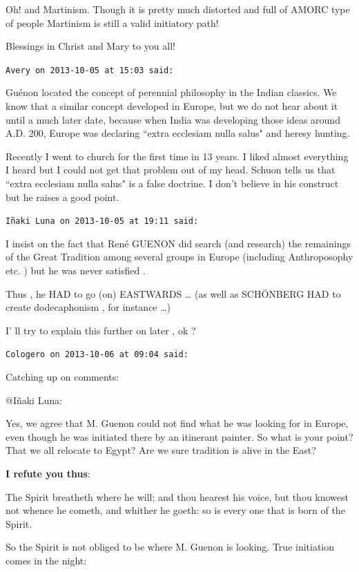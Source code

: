 \begin{footnotesize}
\begin{sffamily}
Oh! and Martinism. Though it is pretty much distorted and full of AMORC type of people Martinism is still a valid initiatory path!

Blessings in Christ and Mary to you all!


\hfill

\texttt{Avery on 2013-10-05 at 15:03 said: }

Guénon located the concept of perennial philosophy in the Indian classics. We know that a similar concept developed in Europe, but we do not hear about it until a much later date, because when India was developing those ideas around A.D. 200, Europe was declaring ``extra ecclesiam nulla salus" and heresy hunting.

Recently I went to church for the first time in 13 years. I liked almost everything I heard but I could not get that problem out of my head. Schuon tells us that ``extra ecclesiam nulla salus" is a false doctrine. I don't believe in his construct but he raises a good point.


\hfill

\texttt{Iñaki Luna on 2013-10-05 at 19:11 said: }

I insist on the fact that René GUENON did search (and research) the remainings of the Great Tradition among several groups in Europe (including Anthroposophy etc. ) but he was never satisfied .

Thus , he HAD to go (on) EASTWARDS … (as well as SCHÖNBERG HAD to create dodecaphonism , for instance …) 

I' ll try to explain this further on later , ok ?


\hfill

\texttt{Cologero on 2013-10-06 at 09:04 said: }

Catching up on comments:

@Iñaki Luna:

Yes, we agree that M. Guenon could not find what he was looking for in Europe, even though he was initiated there by an itinerant painter. So what is your point? That we all relocate to Egypt? Are we sure tradition is alive in the East?

\textbf{I refute you thus}:

The Spirit breatheth where he will; and thou hearest his voice, but thou knowest not whence he cometh, and whither he goeth: so is every one that is born of the Spirit.

So the Spirit is not obliged to be where M. Guenon is looking. True initiation comes in the night: 


\end{sffamily}
\end{footnotesize}
